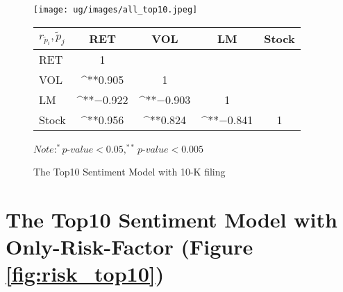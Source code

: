 \documentclass[logo,bsc,singlespacing,parskip]{infthesis}
\begin{document}
\begin{figure}[p]
\centering
\begin{minipage}{0.90\textwidth}
    \centering
    \texttt{[image: ug/images/all\_top10.jpeg]}
    \caption{The Top10 Sentiment Model with 10-K filing}
    \label{fig:all_top10}
\end{minipage}%
\hfill
\vspace{30pt} %
\begin{minipage}{0.9\textwidth}

    \begin{minipage}[p]{0.9\textwidth}
    \centering
    \begin{tabular}{lcccc}
    \label{tab:all_top10_corr}
    $r_\tilde{p}_i,\tilde{p}_j$      & RET       & VOL       & LM        & Stock    \\ \hline
    RET    & 1  &   &  &  \\
    VOL    & ^{**}0.905   & 1  &  &   \\
    LM    & ^{**}$-$0.922 & ^{**}$-$0.903 & 1  &  \\
    Stock  & ^{**}0.956 & ^{**}0.824  & ^{**}$-$0.841 & 1  \\ \hline
    \end{tabular}
    \medskip
    $\textit{Note}: ^{*}p$-$value<0.05, ^{**}p$-$value<0.005$
    \end{minipage}

\end{minipage}
\end{figure}


\section{The Top10 Sentiment Model with Only-Risk-Factor (Figure \ref{fig:risk_top10})}
\label{appendix_corr_risk_top10}
\end{document}
